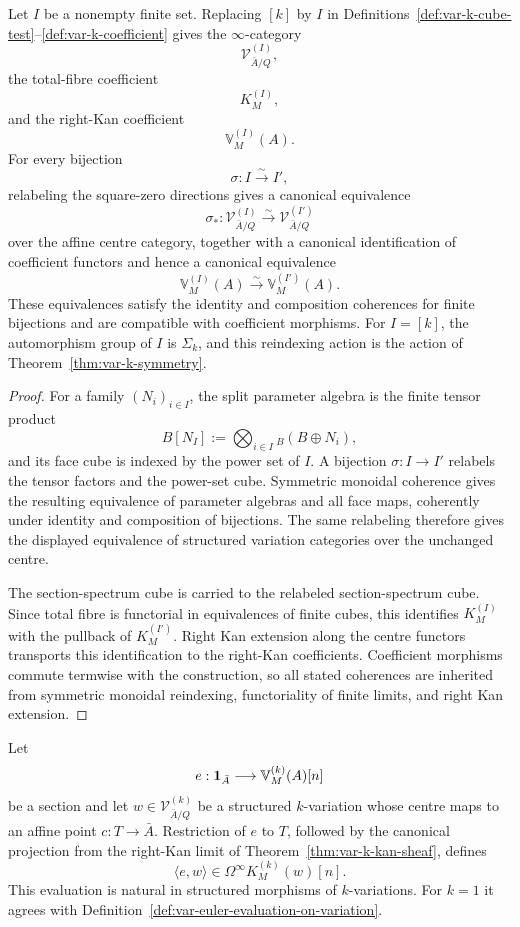 \begin{proposition}
\label{prop:var-finite-set-reindexing}
Let \(I\) be a nonempty finite set. Replacing \([k]\) by \(I\) in Definitions~\ref{def:var-k-cube-test}--\ref{def:var-k-coefficient} gives the \(\infty\)-category
\[
    \mathcal V^{(I)}_{\bar A/Q},
\]
the total-fibre coefficient
\[
    K_M^{(I)},
\]
and the right-Kan coefficient
\[
    \mathbb V_M^{(I)}(A).
\]
For every bijection
\[
    \sigma:I\xrightarrow{\sim}I',
\]
relabeling the square-zero directions gives a canonical equivalence
\[
    \sigma_*:
    \mathcal V^{(I)}_{\bar A/Q}
    \xrightarrow{\sim}
    \mathcal V^{(I')}_{\bar A/Q}
\]
over the affine centre category, together with a canonical identification of coefficient functors and hence a canonical equivalence
\[
    \mathbb V_M^{(I)}(A)
    \xrightarrow{\sim}
    \mathbb V_M^{(I')}(A).
\]
These equivalences satisfy the identity and composition coherences for finite bijections and are compatible with coefficient morphisms. For \(I=[k]\), the automorphism group of \(I\) is \(\Sigma_k\), and this reindexing action is the action of Theorem~\ref{thm:var-k-symmetry}.
\end{proposition}

\begin{proof}
For a family \((N_i)_{i\in I}\), the split parameter algebra is the finite tensor product
\[
    B[N_I]
    :=
    \bigotimes_{i\in I}{}_B(B\oplus N_i),
\]
and its face cube is indexed by the power set of \(I\). A bijection \(\sigma:I\to I'\) relabels the tensor factors and the power-set cube. Symmetric monoidal coherence gives the resulting equivalence of parameter algebras and all face maps, coherently under identity and composition of bijections. The same relabeling therefore gives the displayed equivalence of structured variation categories over the unchanged centre.

The section-spectrum cube is carried to the relabeled section-spectrum cube. Since total fibre is functorial in equivalences of finite cubes, this identifies \(K_M^{(I)}\) with the pullback of \(K_M^{(I')}\). Right Kan extension along the centre functors transports this identification to the right-Kan coefficients. Coefficient morphisms commute termwise with the construction, so all stated coherences are inherited from symmetric monoidal reindexing, functoriality of finite limits, and right Kan extension.
\end{proof}

\begin{definition}
\label{def:var-k-evaluation}
Let
\[
    e:\mathbf 1_{\bar A}\longrightarrow\mathbb V_M^{(k)}(A)[n]
\]
be a section and let \(w\in\mathcal V^{(k)}_{\bar A/Q}\) be a structured \(k\)-variation whose centre maps to an affine point \(c:T\to\bar A\). Restriction of \(e\) to \(T\), followed by the canonical projection from the right-Kan limit of Theorem~\ref{thm:var-k-kan-sheaf}, defines
\[
    \boxed{
    \langle e,w\rangle
    \in
    \Omega^\infty K_M^{(k)}(w)[n].
    }
\]
This evaluation is natural in structured morphisms of \(k\)-variations. For \(k=1\) it agrees with Definition~\ref{def:var-euler-evaluation-on-variation}.
\end{definition}

